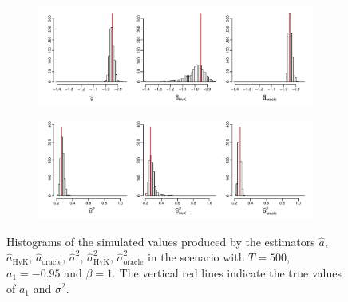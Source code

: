 \begin{figure}[t!]
\centering
\begin{subfigure}[b]{\textwidth}
\includegraphics[width=\textwidth]{Plots/a_hat_histograms_a1=-95_T=500_slope=1_(q,K1,K2,M1,M2)=(25,2,10,20,30).pdf}
\end{subfigure}
\begin{subfigure}[b]{\textwidth}
\includegraphics[width=\textwidth]{Plots/lrv_histograms_a1=-95_T=500_slope=1_(q,K1,K2,M1,M2)=(25,2,10,20,30).pdf}
\end{subfigure}
\caption{Histograms of the simulated values produced by the estimators $\widehat{a}$, $\widehat{a}_{\text{HvK}}$, $\widehat{a}_{\text{oracle}}$, $\widehat{\sigma}^2$, $\widehat{\sigma}^2_{\text{HvK}}$, $\widehat{\sigma}^2_{\text{oracle}}$ in the scenario with $T=500$, $a_1 = -0.95$ and $\beta = 1$. The vertical red lines indicate the true values of $a_1$ and $\sigma^2$.}\label{fig:hist_scenario1} 
\end{figure}


